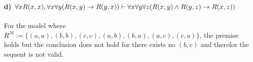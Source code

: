 \documentclass[12pt,oneside,reqno]{amsart}
\begin{document}
\textbf{d) $\forall x R(x,x), \forall x \forall y(R(x,y) \rightarrow{} R(y,x)) \vdash \forall x \forall y \forall z(R(x,y) \land R(y,z) \rightarrow{} R(x,z)) $}\\\\
For the model where $R^M := \{(a,a), (b,b), (c,c), (a,b), (b,a), (a,c), (c,a)\}$, the premise holds but the conclusion does not hold for there exists no $(b,c)$ and therefor the sequent is not valid.
\end{document}
